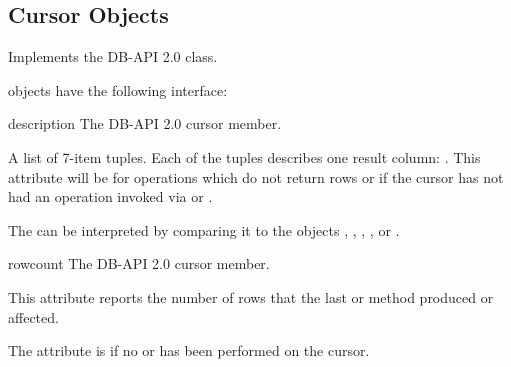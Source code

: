 %
%

\subsection{Cursor Objects}

Implements the DB-API 2.0  class.

 objects have the following interface:

\begin{memberdesc}[Cursor]{description}
The DB-API 2.0 cursor  member.

A list of 7-item tuples.  Each of the tuples describes one result
column: .  This attribute will be  for
operations which do not return rows or if the cursor has not had an
operation invoked via  or .

The  can be interpreted by comparing it to the
 objects , ,
, , or .
\end{memberdesc}

\begin{memberdesc}[Cursor]{rowcount}
The DB-API 2.0 cursor  member.

This attribute reports the number of rows that the last
 or  method produced or
affected.

The attribute is  if no  or
 has been performed on the cursor.
\end{memberdesc}

